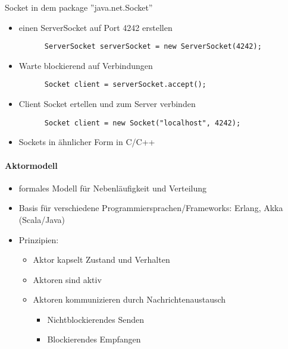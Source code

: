 \documentclass[10pt]{article}
\begin{document}
Socket in dem package ''java.net.Socket''
\begin{itemize}
  \item einen ServerSocket auf Port 4242 erstellen
        \begin{lstlisting} 
      ServerSocket serverSocket = new ServerSocket(4242); 
    \end{lstlisting}
  \item Warte blockierend auf Verbindungen
        \begin{lstlisting} 
      Socket client = serverSocket.accept(); 
    \end{lstlisting}
  \item Client Socket ertellen und zum Server verbinden
        \begin{lstlisting} 
      Socket client = new Socket("localhost", 4242); 
    \end{lstlisting}
  \item Sockets in ähnlicher Form in C/C++
\end{itemize}

\paragraph{Aktormodell}
\begin{itemize}
  \item formales Modell für Nebenläufigkeit und Verteilung
  \item Basis für verschiedene Programmiersprachen/Frameworks: Erlang, Akka (Scala/Java)
  \item Prinzipien:
        \begin{itemize}
          \item Aktor kapselt Zustand und Verhalten
          \item Aktoren sind aktiv
          \item Aktoren kommunizieren durch Nachrichtenaustausch
                \begin{itemize}
                  \item Nichtblockierendes Senden
                  \item Blockierendes Empfangen
                \end{itemize}
        \end{itemize}
\end{itemize}
\end{document}
